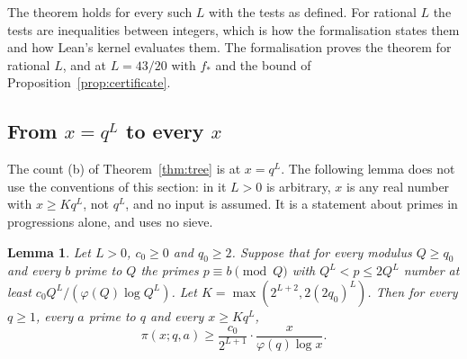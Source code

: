 \documentclass[11pt]{article}
\newtheorem{lemma}[theorem]{Lemma}
\theoremstyle{definition}
\begin{document}
The theorem holds for every such $L$ with the tests as defined. For rational $L$ the tests are inequalities between
integers, which is how the formalisation states them and how Lean's kernel evaluates them. The formalisation proves
the theorem for rational $L$, and at $L = 43/20$ with $f_*$ and the bound of Proposition~\ref{prop:certificate}.

\subsection{From \texorpdfstring{$x = q^L$}{x = q\textasciicircum L} to every \texorpdfstring{$x$}{x}}\label{sec:every-x}

The count (b) of Theorem~\ref{thm:tree} is at $x = q^L$. The following lemma does not use the conventions of this
section: in it $L > 0$ is arbitrary, $x$ is any real number with $x \ge Kq^L$, not $q^L$, and no input is assumed.
It is a statement about primes in progressions alone, and uses no sieve.

\begin{lemma}\label{lem:every-x}
Let $L > 0$, $c_0 \ge 0$ and $q_0 \ge 2$. Suppose that for every modulus $Q \ge q_0$ and every $b$ prime to $Q$ the
primes $p \equiv b \pmod Q$ with $Q^L < p \le 2Q^L$ number at least $c_0 Q^L/(\varphi(Q) \log Q^L)$. Let $K =
\max(2^{L + 2}, 2(2q_0)^L)$. Then for every $q \ge 1$, every $a$ prime to $q$ and every $x \ge Kq^L$,
\[
  \pi(x; q, a) \ge \frac{c_0}{2^{L + 1}} \cdot \frac{x}{\varphi(q) \log x}.
\]
\end{lemma}
\end{document}

